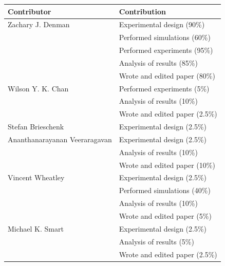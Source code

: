 \begin{center}
  \begin{tabular}{ll}
    \toprule
    Contributor   & Contribution \\
    \midrule
    Zachary J. Denman             & Experimental design (90\%)\\
                                  & Performed simulations (60\%)\\
                                  & Performed experiments (95\%)\\
                                  & Analysis of results (85\%)\\
                                  & Wrote and edited paper (80\%)\\
    \midrule
    Wilson Y. K. Chan             & Performed experiments (5\%)\\
                                  & Analysis of results (10\%)\\
                                  & Wrote and edited paper (2.5\%)\\
    \midrule
    Stefan Brieschenk             & Experimental design (2.5\%)\\
    \midrule
    Ananthanarayanan Veeraragavan & Experimental design (2.5\%)\\
                                  & Analysis of results (10\%)\\
                                  & Wrote and edited paper (10\%)\\
    \midrule
    Vincent Wheatley              & Experimental design (2.5\%)\\
                                  & Performed simulations (40\%)\\
                                  & Analysis of results (10\%)\\
                                  & Wrote and edited paper (5\%)\\
    \midrule
    Michael K. Smart              & Experimental design (2.5\%)\\
                                  & Analysis of results (5\%)\\
                                  & Wrote and edited paper (2.5\%)\\
    \bottomrule
  \end{tabular}
\end{center}

\clearpage
\noindent{}\\

